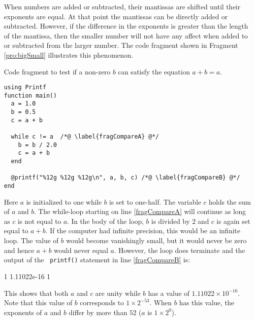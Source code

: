 When numbers are added or subtracted, their mantissas are shifted
until their exponents are equal.  At that point the mantissas can be
directly added or subtracted.  However, if the difference in the
exponents is greater than the length of the mantissa, then the smaller
number will not have any affect when added to or subtracted from the
larger number.  The code fragment shown in Fragment \ref{pro:bigSmall}
illustrates this phenomenon.
\begin{fragment}
Code fragment to test if a non-zero $b$ can satisfy the equation
$a+b=a$. \label{pro:bigSmall}
\codemiddle
\begin{lstlisting}
using Printf
function main()
  a = 1.0
  b = 0.5
  c = a + b

  while c != a  /*@ \label{fragCompareA} @*/
    b = b / 2.0
    c = a + b
  end

  @printf("%12g %12g %12g\n", a, b, c) /*@ \label{fragCompareB} @*/
end
\end{lstlisting}
\end{fragment}
Here $a$ is initialized to one while $b$ is set to one-half.  The
variable $c$ holds the sum of $a$ and $b$.  The while-loop starting on
line \ref{fragCompareA} will continue as long as $c$ is not equal to
$a$.  In the body of the loop, $b$ is divided by $2$ and $c$ is again
set equal to $a+b$.  If the computer had infinite precision, this
would be an infinite loop.  The value of $b$ would become vanishingly
small, but it would never be zero and hence $a+b$ would never equal
$a$.  However, the loop does terminate and the output of the {\tt
printf()} statement in line \ref{fragCompareB} is:
\begin{code}
           1   1.11022e-16   1
\end{code}
This shows that both $a$ and $c$ are unity while $b$ has a value of 
$1.11022\times10^{-16}$.  Note that this value of $b$ corresponds to
$1\times 2^{-53}$.  When $b$ has this value, the exponents of $a$ and $b$
differ by more than $52$ ($a$ is $1\times 2^0$).

